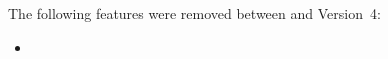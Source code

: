 \begin{blockChanged}

\renewcommand{\thesubsection}{\changed{\Alph{section}}.\changed{\arabic{subsection}}}

\subsection{}

The following features were removed between \sbmltwothree and
Version~4:
\begin{itemize}

\item











\end{itemize}

\end{blockChanged}

\renewcommand{\thesubsection}{\Alph{section}.\arabic{subsection}}
